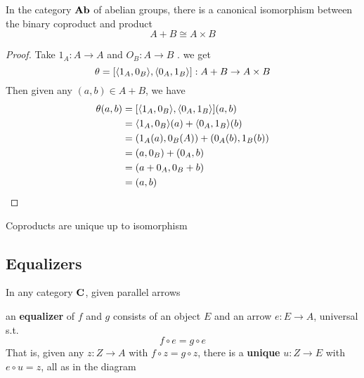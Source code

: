 \documentclass[11pt]{article}
\begin{document}
\begin{proposition}[]
In the category \(\operatorname{\textbf{Ab}}\) of abelian groups, there is a canonical isomorphism
between the binary coproduct and product
\begin{equation*}
A+B\cong A\times B
\end{equation*}
\end{proposition}

\begin{proof}
Take \(1_A:A\to A\) and \(O_B:A\to B\) . we get
\begin{equation*}
\theta=[\langle 1_A,0_B\rangle,\langle 0_A,1_B\rangle]:A+B\to A\times B
\end{equation*}
Then given any \((a,b)\in A+B\), we have
\begin{align*}
\theta(a,b)&=
[\langle 1_A,0_B\rangle,\langle0_A,1_B\rangle](a,b)\\
&=\langle 1_A,0_B\rangle(a)+\langle0_A,1_B\rangle(b)\\
&=(1_A(a),0_B(A))+(0_A(b),1_B(b))\\
&=(a,0_B)+(0_A,b)\\
&=(a+0_A,0_B+b)\\
&=(a,b)
\end{align*}
\end{proof}

\begin{proposition}[]
Coproducts are unique up to isomorphism
\end{proposition}

\subsection{Equalizers}
\label{sec:org0391206}
\begin{definition}[]
In any category \(\operatorname{\textbf{C}}\), given parallel arrows
\begin{center}\end{center}
an \textbf{equalizer} of \(f\) and \(g\) consists of an object \(E\) and an arrow
\(e:E\to A\), universal s.t.
\begin{equation*}
f\circ e=g\circ e
\end{equation*}
That is, given any \(z:Z\to A\) with \(f\circ z=g\circ z\), there is a \textbf{unique}
\(u:Z\to E\) with \(e\circ u=z\), all as in the diagram
\begin{center}\end{center}
\end{definition}
\end{document}
